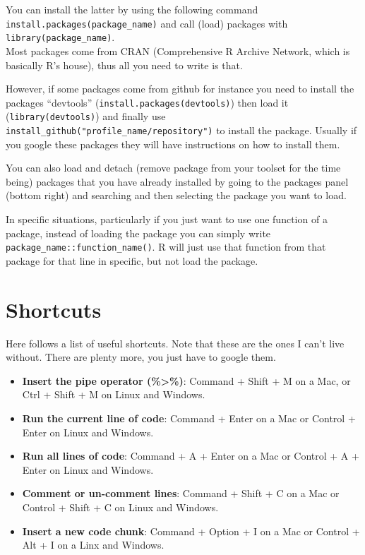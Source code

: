 \documentclass[
]{book}
\providecommand{\tightlist}{%
  \setlength{\itemsep}{0pt}\setlength{\parskip}{0pt}}
\begin{document}
You can install the latter by using the following command \texttt{install.packages(\textquotesingle{}package\_name\textquotesingle{})} and call (load) packages with \texttt{library(package\_name)}.\\

Most packages come from CRAN (Comprehensive R Archive Network, which is basically R's house), thus all you need to write is that.

However, if some packages come from github for instance you need to install the packages ``devtools'' (\texttt{install.packages(\textquotesingle{}devtools\textquotesingle{})}) then load it (\texttt{library(devtools)}) and finally use \texttt{install\_github("profile\_name/repository")} to install the package.
Usually if you google these packages they will have instructions on how to install them.

You can also load and detach (remove package from your toolset for the time being) packages that you have already installed by going to the packages panel (bottom right) and searching and then selecting the package you want to load.

In specific situations, particularly if you just want to use one function of a package, instead of loading the package you can simply write \texttt{package\_name::function\_name()}.
R will just use that function from that package for that line in specific, but not load the package.

\hypertarget{shortcuts}{%
\section{Shortcuts}\label{shortcuts}}

Here follows a list of useful shortcuts.
Note that these are the ones I can't live without.
There are plenty more, you just have to google them.

\begin{itemize}
\tightlist
\item
  \textbf{Insert the pipe operator (\%\textgreater\%)}: Command + Shift + M on a Mac, or Ctrl + Shift + M on Linux and Windows.\\
\item
  \textbf{Run the current line of code}: Command + Enter on a Mac or Control + Enter on Linux and Windows.\\
\item
  \textbf{Run all lines of code}: Command + A + Enter on a Mac or Control + A + Enter on Linux and Windows.\\
\item
  \textbf{Comment or un-comment lines}: Command + Shift + C on a Mac or Control + Shift + C on Linux and Windows.\\
\item
  \textbf{Insert a new code chunk}: Command + Option + I on a Mac or Control + Alt + I on a Linx and Windows.\\
\end{itemize}
\end{document}
